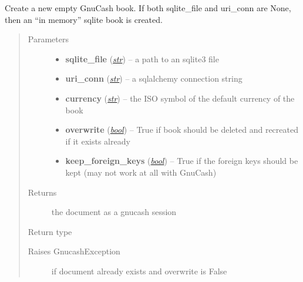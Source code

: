 \documentclass[letterpaper,10pt,english]{sphinxmanual}
\begin{document}

\begin{fulllineitems}
\label{api/piecash.model_core.session:piecash.model_core.session.create_book}
Create a new empty GnuCash book. If both sqlite\_file and uri\_conn are None, then an ``in memory'' sqlite book is created.
\begin{quote}\begin{description}
\item[{Parameters}] \leavevmode\begin{itemize}
\item {} 
\textbf{sqlite\_file} (\href{http://docs.python.org/library/functions.html\#str}{\emph{str}}) -- a path to an sqlite3 file

\item {} 
\textbf{uri\_conn} (\href{http://docs.python.org/library/functions.html\#str}{\emph{str}}) -- a sqlalchemy connection string

\item {} 
\textbf{currency} (\href{http://docs.python.org/library/functions.html\#str}{\emph{str}}) -- the ISO symbol of the default currency of the book

\item {} 
\textbf{overwrite} (\href{http://docs.python.org/library/functions.html\#bool}{\emph{bool}}) -- True if book should be deleted and recreated if it exists already

\item {} 
\textbf{keep\_foreign\_keys} (\href{http://docs.python.org/library/functions.html\#bool}{\emph{bool}}) -- True if the foreign keys should be kept (may not work at all with GnuCash)

\end{itemize}

\item[{Returns}] \leavevmode
the document as a gnucash session

\item[{Return type}] \leavevmode
{\hyperref[api/piecash.model_core.session:piecash.model_core.session.GncSession]{}}

\item[{Raises GnucashException}] \leavevmode
if document already exists and overwrite is False

\end{description}\end{quote}

\end{fulllineitems}
\end{document}
